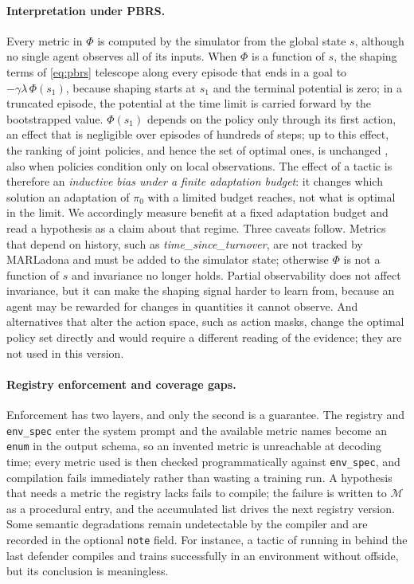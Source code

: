 \documentclass[11pt]{article}
\newcommand{\Mst}{\mathcal{M}}           %
\newcommand{\code}[1]{\texttt{\small #1}}
\begin{document}
\paragraph{Interpretation under PBRS.}
Every metric in $\Phi$ is computed by the simulator from the global state $s$, although no single agent observes all of its inputs.
When $\Phi$ is a function of $s$, the shaping terms of \cref{eq:pbrs} telescope along every episode that ends in a goal to $-\gamma\lambda\,\Phi(s_1)$, because shaping starts at $s_1$ and the terminal potential is zero; in a truncated episode, the potential at the time limit is carried forward by the bootstrapped value.
$\Phi(s_1)$ depends on the policy only through its first action, an effect that is negligible over episodes of hundreds of steps; up to this effect, the ranking of joint policies, and hence the set of optimal ones, is unchanged \citep{ng1999policy}, also when policies condition only on local observations.
The effect of a tactic is therefore an \emph{inductive bias under a finite adaptation budget}: it changes which solution an adaptation of $\pi_0$ with a limited budget reaches, not what is optimal in the limit.
We accordingly measure benefit at a fixed adaptation budget and read a hypothesis as a claim about that regime.
Three caveats follow.
Metrics that depend on history, such as \textit{time\_since\_turnover}, are not tracked by MARLadona and must be added to the simulator state; otherwise $\Phi$ is not a function of $s$ and invariance no longer holds.
Partial observability does not affect invariance, but it can make the shaping signal harder to learn from, because an agent may be rewarded for changes in quantities it cannot observe.
And alternatives that alter the action space, such as action masks, change the optimal policy set directly and would require a different reading of the evidence; they are not used in this version.

\paragraph{Registry enforcement and coverage gaps.}
Enforcement has two layers, and only the second is a guarantee.
The registry and \code{env\_spec} enter the system prompt and the available metric names become an \code{enum} in the output schema, so an invented metric is unreachable at decoding time; every metric used is then checked programmatically against \code{env\_spec}, and compilation fails immediately rather than wasting a training run.
A hypothesis that needs a metric the registry lacks fails to compile; the failure is written to $\Mst$ as a procedural entry, and the accumulated list drives the next registry version.
Some semantic degradations remain undetectable by the compiler and are recorded in the optional \code{note} field.
For instance, a tactic of running in behind the last defender compiles and trains successfully in an environment without offside, but its conclusion is meaningless.
\end{document}
